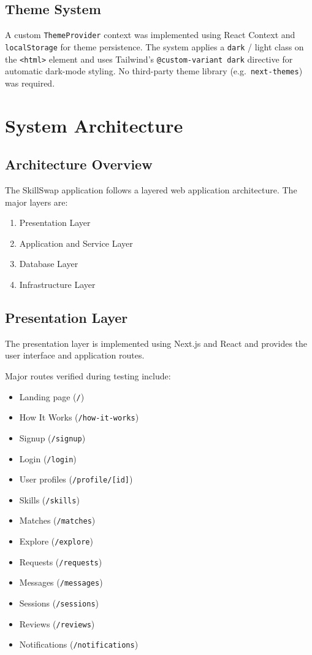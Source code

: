 \documentclass[12pt,a4paper]{report}
\begin{document}
\section{Theme System}
A custom \texttt{ThemeProvider} context was implemented using React Context and
\texttt{localStorage} for theme persistence.  The system applies a
\texttt{dark} / light class on the \texttt{<html>} element and uses Tailwind's
\texttt{@custom-variant dark} directive for automatic dark-mode styling.
No third-party theme library (e.g.\ \texttt{next-themes}) was required.

\chapter{System Architecture}

\section{Architecture Overview}
The SkillSwap application follows a layered web application architecture.  The
major layers are:

\begin{enumerate}[noitemsep]
  \item Presentation Layer
  \item Application and Service Layer
  \item Database Layer
  \item Infrastructure Layer
\end{enumerate}

\section{Presentation Layer}
The presentation layer is implemented using Next.js and React and provides the
user interface and application routes.

Major routes verified during testing include:

\begin{itemize}[noitemsep]
  \item Landing page (\texttt{/})
  \item How It Works (\texttt{/how-it-works})
  \item Signup (\texttt{/signup})
  \item Login (\texttt{/login})
  \item User profiles (\texttt{/profile/[id]})
  \item Skills (\texttt{/skills})
  \item Matches (\texttt{/matches})
  \item Explore (\texttt{/explore})
  \item Requests (\texttt{/requests})
  \item Messages (\texttt{/messages})
  \item Sessions (\texttt{/sessions})
  \item Reviews (\texttt{/reviews})
  \item Notifications (\texttt{/notifications})
\end{itemize}
\end{document}
